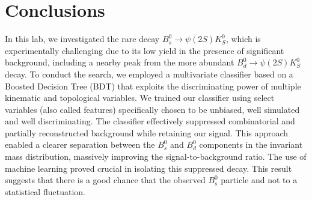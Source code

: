 \chapter*{Conclusions}\label{chap:conclusion}

In this lab, we investigated the rare decay $B^{0}_{s} \xrightarrow{} \psi(2S)K^{0}_{S}$, which is experimentally challenging due to its low yield in the presence of significant background, including a nearby peak from the more abundant $B^{0}_d \xrightarrow{} \psi(2S)K^{0}_{S}$ decay. To conduct the search, we employed a multivariate classifier based on a Boosted Decision Tree (BDT) that exploits the discriminating power of multiple kinematic and topological variables. We trained our classifier using select variables (also called features) specifically chosen to be unbiased, well simulated and well discriminating. The classifier effectively suppressed combinatorial and partially reconstructed background while retaining our signal. This approach enabled a clearer separation between the $B^{0}_{s}$ and $B^{0}_{d}$ components in the invariant mass distribution, massively improving the signal-to-background ratio. The use of machine learning proved crucial in isolating this suppressed decay. This result suggests that there is a good chance that the observed $B^{0}_{s}$ particle and not to a statistical fluctuation.
